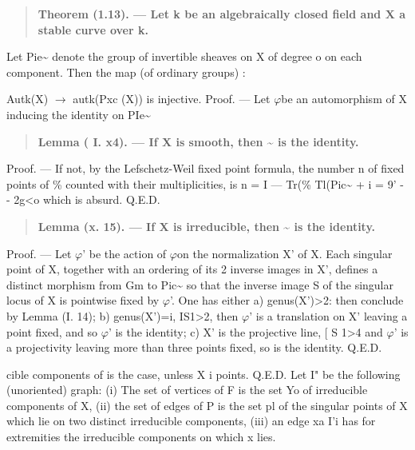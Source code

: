 \documentclass[11pt]{article}
\theoremstyle{plain}
\theoremstyle{definition}
\theoremstyle{remark}
\begin{document}
\begin{quote}\textbf{Theorem (1.13). --- Let k be an algebraically closed field and X a stable curve over k.}\end{quote}
Let Pie\textasciitilde{} denote the group of invertible sheaves on X of degree o on each component. Then the map (of ordinary groups) :

Autk(X) $\to$ autk(Pxc (X)) is injective. Proof. --- Let $\varphi$be an automorphism of X inducing the identity on PIe\textasciitilde{}

\begin{quote}\textbf{Lemma ( I. x4). --- If X is smooth, then \textasciitilde{} is the identity.}\end{quote}
Proof. --- If not, by the Lefschetz-Weil fixed point formula, the number n of fixed points of \% counted with their multiplicities, is n = I --- Tr(\% Tl(Pic\textasciitilde{} + i = 9' - - 2g<o which is absurd. Q.E.D.

\begin{quote}\textbf{Lemma (x. 15). --- If X is irreducible, then \textasciitilde{} is the identity.}\end{quote}
Proof. --- Let $\varphi$' be the action of $\varphi$on the normalization X' of X. Each singular point of X, together with an ordering of its 2 inverse images in X', defines a distinct morphism from Gm to Pic\textasciitilde{} so that the inverse image S of the singular locus of X is pointwise fixed by $\varphi$'. One has either a) genus(X')>2: then conclude by Lemma (I. 14); b) genus(X')=i, IS1>2, then $\varphi$' is a translation on X' leaving a point fixed, and so $\varphi$' is the identity; c) X' is the projective line, [ S 1>4 and $\varphi$' is a projectivity leaving more than three points fixed, so is the identity. Q.E.D.

cible components of is the case, unless X i points. Q.E.D. Let I" be the following (unoriented) graph: (i) The set of vertices of F is the set Yo of irreducible components of X, (ii) the set of edges of P is the set pl of the singular points of X which lie on two distinct irreducible components, (iii) an edge xa I'i has for extremities the irreducible components on which x lies.
\end{document}
